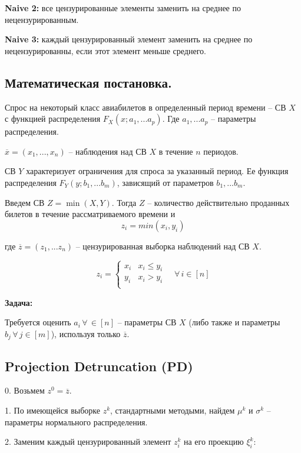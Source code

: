 \documentclass[reqno]{article}
\theoremstyle{definition}
\theoremstyle{definition}
\theoremstyle{definition}
\theoremstyle{definition}
\theoremstyle{definition}
\theoremstyle{definition}
\theoremstyle{definition}
\theoremstyle{definition}
\theoremstyle{definition}
\begin{document}
		\textbf{Naive 2:} все цензурированные элементы заменить на среднее по нецензурированным.
		
		\textbf{Naive 3:} каждый цензурированный элемент заменить на среднее по нецензурированны, если этот элемент меньше среднего.
		
		\subsection{Математическая постановка.}
		
		Спрос на некоторый класс авиабилетов в определенный период времени -- СВ $X$ с функцией распределения $F_X(x; a_1, ... a_p)$. Где $a_1, ... a_p$ -- параметры распределения.
		
		$\overline{x} = (x_1, ... , x_n)$ -- наблюдения над СВ $X$ в течение $n$ периодов.
		
		СВ $Y$ характеризует ограничения для спроса за указанный период. Ее функция распределения $F_Y(y; b_1, ... b_m)$, зависящий от параметров $b_1, ... b_m$.
		
		Введем СВ $Z = \min(X, Y)$. Тогда $Z$ -- количество действительно проданных билетов в течение рассматриваемого времени и
		$$z_i = min(x_i, y_i)$$
	
		где $\overline{z} = (z_1, ... z_n)$ -- цензурированная выборка наблюдений над СВ $X$.
		
		$$
		z_i =
		\begin{cases}
			x_i & x_i \leq y_i\\
			y_i & x_i > y_i   \\
		\end{cases}
		\quad \forall\, i \in [n]
		$$
		
		\textbf{Задача:}
		
		Требуется оценить $a_i\,\forall\,\in [n]$ -- параметры СВ $X$ (либо также и параметры $b_j\,\forall\,j \in [m]$), используя только $\overline{z}$.
		
		
		\subsection{Projection Detruncation (PD)}
		
		0. Возьмем $z^0 = \overline{z}$.
		
		1. По имеющейся выборке $z^k$, стандартными методыми, найдем $\mu^{k}$ и $\sigma^{k}$ -- параметры нормального распределения.
		
		2. Заменим каждый цензурированный элемент $z_i^{k}$ на его проекцию $\xi_i^{k}$:
		
\end{document}
